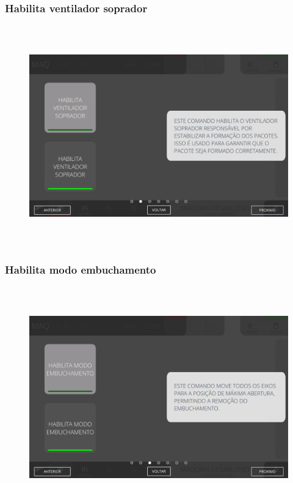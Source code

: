 \newpage
\thispagestyle{fancy}
\vspace*{40 pt}
\subsubsection{\small{Habilita ventilador soprador}}
\vspace*{\fill}
\begin{figure}[h]
  \centering
  \includegraphics[width=576px,height=360px]{src/imagesFlexo/08-count/commands/e-2.png}
\end{figure}
\vspace*{\fill}

\newpage
\thispagestyle{fancy}
\vspace*{40 pt}
\subsubsection{\small{Habilita modo embuchamento}}
\vspace*{\fill}
\begin{figure}[h]
  \centering
  \includegraphics[width=576px,height=360px]{src/imagesFlexo/08-count/commands/e-3.png}
\end{figure}
\vspace*{\fill}

